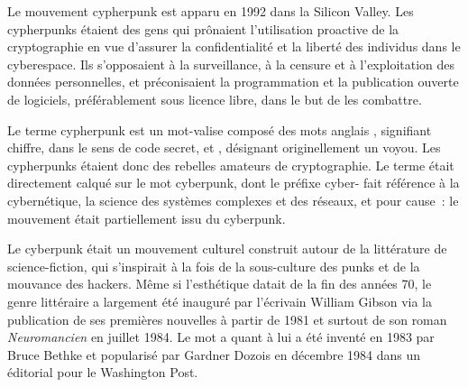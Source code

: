 Le mouvement cypherpunk est apparu en 1992 dans la Silicon Valley. Les cypherpunks étaient des gens qui prônaient l'utilisation proactive de la cryptographie en vue d'assurer la confidentialité et la liberté des individus dans le cyberespace. Ils s'opposaient à la surveillance, à la censure et à l'exploitation des données personnelles, et préconisaient la programmation et la publication ouverte de logiciels, préférablement sous licence libre, dans le but de les combattre.

Le terme cypherpunk est un mot-valise composé des mots anglais , signifiant chiffre, dans le sens de code secret, et , désignant originellement un voyou. Les cypherpunks étaient donc des rebelles amateurs de cryptographie. Le terme était directement calqué sur le mot cyberpunk, dont le préfixe cyber- fait référence à la cybernétique, la science des systèmes complexes et des réseaux, et pour cause~: le mouvement était partiellement issu du cyberpunk.

Le cyberpunk était un mouvement culturel construit autour de la littérature de science-fiction, qui s'inspirait à la fois de la sous-culture des punks et de la mouvance des hackers. Même si l'esthétique datait de la fin des années 70, le genre littéraire a largement été inauguré par l'écrivain William Gibson via la publication de ses premières nouvelles à partir de 1981 et surtout de son roman \emph{Neuromancien} en juillet 1984. Le mot a quant à lui a été inventé en 1983 par Bruce Bethke et popularisé par Gardner Dozois en décembre 1984 dans un éditorial pour le Washington Post. %

